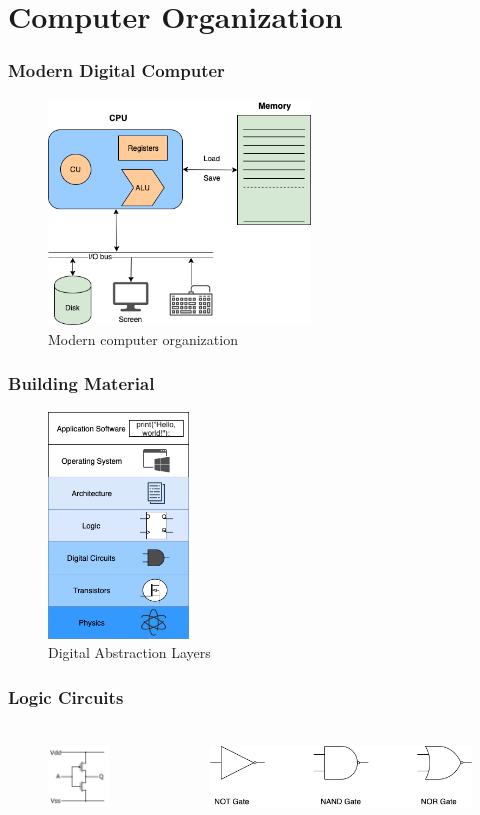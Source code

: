 \documentclass{beamer}
\begin{document}
\section{Computer Organization}

\begin{frame}
\frametitle{Modern Digital Computer}
\begin{figure}[h!]
  \includegraphics[height=6cm]{img/computer_organization.png}
    \caption{Modern computer organization}
\end{figure}
\end{frame}

\begin{frame}
\frametitle{Building Material}
\begin{figure}[h!]
  \includegraphics[height=6cm]{img/digital_abstraction.png}
    \caption{Digital Abstraction Layers}
\end{figure}
\end{frame}

\begin{frame}
\frametitle{Logic Circuits}
\begin{columns}
\begin{figure}[h!]
  \includegraphics[height=2cm]{img/CMOS_inverter.png}
\end{figure}
\begin{figure}[h!]
  \includegraphics[height=2cm]{img/basic_gates.png}
\end{figure}
\end{columns}
\end{frame}
\end{document}
